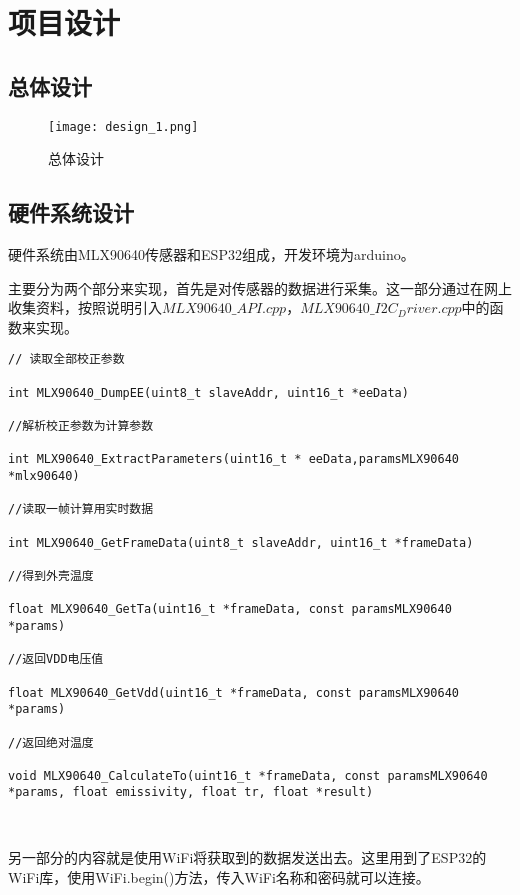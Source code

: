 \chapter{项目设计}
\section{总体设计}
\begin{figure}[htbp]
    \centering
    \texttt{[image: design\_1.png]}
    \caption{总体设计}\label{fig:design_1}
    \vspace{\baselineskip}
    \end{figure}


\section{硬件系统设计}
硬件系统由MLX90640传感器和ESP32组成，开发环境为arduino。

主要分为两个部分来实现，首先是对传感器的数据进行采集。这一部分通过在网上收集资料，按照说明引入$MLX90640\_API.cpp$，$MLX90640\_I2C_Driver.cpp$中的函数来实现。

\begin{lstlisting} 
// 读取全部校正参数
    
int MLX90640_DumpEE(uint8_t slaveAddr, uint16_t *eeData) 
    
//解析校正参数为计算参数
    
int MLX90640_ExtractParameters(uint16_t * eeData,paramsMLX90640 *mlx90640) 
    
//读取一帧计算用实时数据
    
int MLX90640_GetFrameData(uint8_t slaveAddr, uint16_t *frameData) 
    
//得到外壳温度
    
float MLX90640_GetTa(uint16_t *frameData, const paramsMLX90640 *params)
    
//返回VDD电压值
   
float MLX90640_GetVdd(uint16_t *frameData, const paramsMLX90640 *params)
    
//返回绝对温度
   
void MLX90640_CalculateTo(uint16_t *frameData, const paramsMLX90640 *params, float emissivity, float tr, float *result)
    
    
\end{lstlisting}

另一部分的内容就是使用WiFi将获取到的数据发送出去。这里用到了ESP32的WiFi库，使用WiFi.begin()方法，传入WiFi名称和密码就可以连接。

